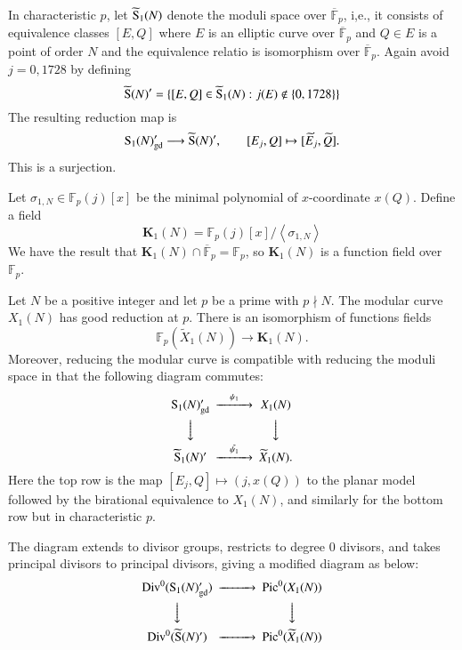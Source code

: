 In characteristic $p$, let $\widetilde{{\rm S}}_1(N)$ denote the moduli space over $\overline{\mathbb{F}}_p$, i,e., 
it consists of equivalence classes $[E,Q]$ where $E$ is an elliptic curve over $\overline{\mathbb{F}}_p$ and $Q\in E$ is 
a point of order $N$ and the equivalence relatio is isomorphism over $\overline{\mathbb{F}}_p$. Again avoid $j=0,1728$
by defining 
\begin{equation*}
    \widetilde{{\rm S}}(N)'=\{[E,Q]\in \widetilde{{\rm S}}_1(N): j(E)\notin \{0,1728\} \}
\end{equation*}
The resulting reduction map is 
\begin{equation*}
    {\rm S}_1(N)'_{\rm gd} \longrightarrow \widetilde{{\rm S}}(N)', \qquad [E_j,Q] \mapsto [\widetilde{E}_j,\widetilde{Q}].
\end{equation*}
This is a surjection.\par
Let $\sigma _{1,N}\in \mathbb{F}_p(j)[x]$ be the minimal polynomial of $x$-coordinate $x(Q)$. Define a field
\begin{equation*}
    \mathbf{K}_1(N)=\mathbb{F}_p(j)[x]/ \left\langle \sigma_{1,N}\right\rangle 
\end{equation*}
We have the result that $\mathbf{K}_1(N)\cap \overline{\mathbb{F}}_p=\mathbb{F}_p$, so $\mathbf{K}_1(N)$ is a function field over 
$\mathbb{F}_p$.
\begin{theorem}
    Let $N$ be a positive integer and let $p$ be a prime with $p\nmid N$. The modular curve $X_1(N)$ has good reduction at $p$.
    There is an isomorphism of functions fields 
    \begin{equation*}
        \mathbb{F}_p(\widetilde{X}_1(N))\longrightarrow \mathbf{K}_1(N).
    \end{equation*}
    Moreover, reducing the modular curve is compatible with reducing the moduli space in that the following diagram commutes:
    $$\begin{CD}
        {\rm S}_1(N)'_{\rm gd} @>\psi_1>> X_1(N)\\
        @VVV @VVV \\
        \widetilde{{\rm S}}_1(N)' @>\tilde{\psi_1}>> \widetilde{X}_1(N).
    \end{CD}$$
    Here the top row is the map $[E_j,Q]\mapsto (j,x(Q))$ to the planar model followed by the birational equivalence to $X_1(N)$,
    and similarly for the bottom row but in characteristic $p$.
\end{theorem}
The diagram extends to divisor groups, restricts to degree $0$ divisors, and takes principal divisors to principal divisors, giving
a modified diagram as below:
\begin{equation}
    \begin{CD}
        {\rm Div}^0({\rm S}_1(N)'_{\rm gd}) @>>> {\rm Pic}^0(X_1(N))\\
        @VVV @VVV\\
        {\rm Div}^0({\widetilde{{\rm S}}}(N)') @>>> {\rm Pic}^0(\widetilde{X}_1(N))
    \end{CD}
    \label{eq:Igusa_theorem} 
\end{equation}



